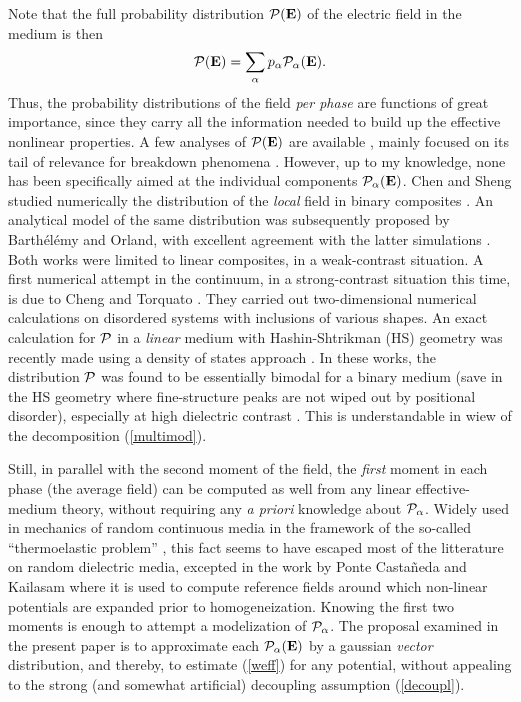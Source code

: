 Note that the full probability distribution ${\cal{P}}({\mathbf E})$
of the electric field in the medium is then
\begin{equation}
\label{multimod}
{\cal{P}}({\mathbf E})=\sum_\alpha p_\alpha{\cal{P}}_\alpha({\mathbf E}).
\end{equation}
Thus, the probability distributions of the field {\em per phase} are
functions of great importance, since they carry all the information
needed to build up the effective nonlinear properties. A few analyses
of ${\cal{P}}({\mathbf E})$ are available \cite{BART97}, mainly focused
on its tail of relevance for breakdown phenomena \cite{DUXB95}. However,
up to my knowledge, none has been specifically aimed at the individual
components ${\cal{P}}_\alpha({\mathbf E})$. Chen and Sheng studied
numerically the distribution of the {\em local} field in binary
composites \cite{CHEN91}. An analytical model of the same distribution
was subsequently proposed by Barth\'{e}l\'{e}my and Orland, with excellent
agreement with the latter simulations \cite{BART97}. Both works were
limited to linear composites, in a weak-contrast situation. A first
numerical attempt in the continuum, in a strong-contrast situation
this time, is due to Cheng and Torquato \cite{CHEN97}. They carried
out two-dimensional numerical calculations on disordered systems with
inclusions of various shapes. An exact calculation for ${\cal{P}}$ in
a {\em linear} medium with Hashin-Shtrikman (HS) geometry was recently
made using a density of states approach \cite{CULE98}. In these
works, the distribution ${\cal{P}}$ was found to be essentially
bimodal for a binary medium (save in the HS geometry where
fine-structure peaks are not wiped out by positional disorder),
especially at high dielectric contrast \cite{CHEN97}. This is
understandable in wiew of the decomposition (\ref{multimod}).

Still, in parallel with the second moment of the field, the
{\em first} moment in each phase (the average field) can be computed
as well from any linear effective-medium theory, without requiring
any {\it a priori} knowledge about ${\cal{P}}_\alpha$. Widely used in
mechanics of random continuous media in the framework of the
so-called ``thermoelastic problem'' \cite{WILL81}, this fact seems
to have escaped most of the litterature on random dielectric media,
excepted in the work by Ponte Casta\~{n}eda and Kailasam \cite{PONT97}
where it is used to compute reference fields around which non-linear 
potentials are expanded prior to homogeneization. Knowing the first
two moments is enough to attempt a modelization of ${\cal{P}}_\alpha$.
The proposal examined in the present paper is to approximate each
${\cal{P}}_\alpha({\mathbf E})$ by a gaussian {\em vector}
distribution, and thereby, to estimate (\ref{weff}) for any potential,
without appealing to the strong (and somewhat artificial) decoupling
assumption (\ref{decoupl}).

